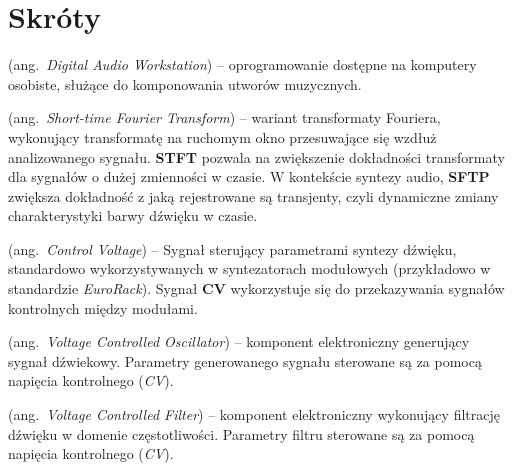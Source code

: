 % 
\chapter*{Skróty}
\label{sec:skroty}
\noindent\vspace{-\topsep-\partopsep-\parsep} %
\begin{description}[labelwidth=*]
  \item [DAW] (ang.\ \emph{Digital Audio Workstation}) -- oprogramowanie dostępne na komputery osobiste, służące do komponowania utworów muzycznych.
  \item [STFT] (ang.\ \emph{Short-time Fourier Transform}) -- wariant transformaty Fouriera, wykonujący transformatę na ruchomym okno przesuwające się wzdłuż analizowanego sygnału. \textbf{STFT} pozwala na zwiększenie dokładności transformaty dla sygnałów o dużej zmienności w czasie. W kontekście syntezy audio, \textbf{SFTP} zwiększa dokładność z jaką rejestrowane są transjenty, czyli dynamiczne zmiany charakterystyki barwy dźwięku w czasie.
  \item [CV] (ang.\ \emph{Control Voltage}) -- Sygnał sterujący parametrami syntezy dźwięku, standardowo wykorzystywanych w syntezatorach modułowych (przykładowo w standardzie \textit{EuroRack}). Sygnał \textbf{CV} wykorzystuje się do przekazywania sygnałów kontrolnych między modułami.
  \item [VCO] (ang.\ \emph{Voltage Controlled Oscillator}) -- komponent elektroniczny generujący sygnał dźwiekowy. Parametry generowanego sygnału sterowane są za pomocą napięcia kontrolnego (\textit{CV}).
  \item [VCF] (ang.\ \emph{Voltage Controlled Filter}) -- komponent elektroniczny wykonujący filtrację dźwięku w domenie częstotliwości. Parametry filtru sterowane są za pomocą napięcia kontrolnego (\textit{CV}).
\end{description}
